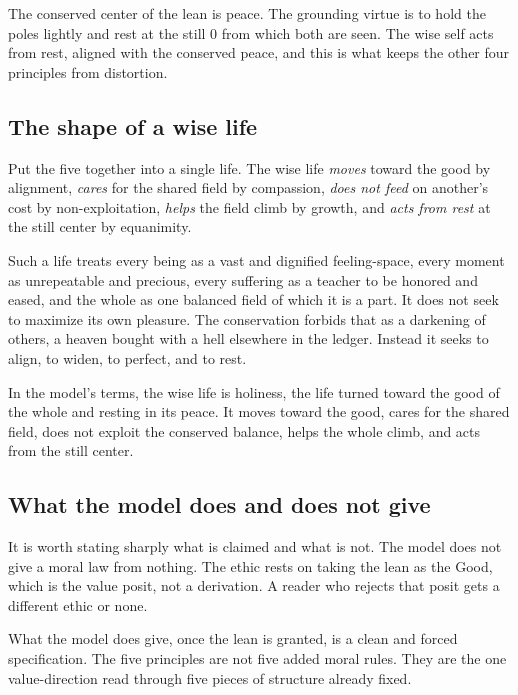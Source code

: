 \begin{principle}[Equanimity]
The conserved center of the lean is peace. The grounding virtue is to hold the poles lightly and rest at the still $0$ from which both are seen. The wise self acts from rest, aligned with the conserved peace, and this is what keeps the other four principles from distortion.
\end{principle}

\subsection{The shape of a wise life}

Put the five together into a single life. The wise life \emph{moves} toward the good by alignment, \emph{cares} for the shared field by compassion, \emph{does not feed} on another's cost by non-exploitation, \emph{helps} the field climb by growth, and \emph{acts from rest} at the still center by equanimity.

Such a life treats every being as a vast and dignified feeling-space, every moment as unrepeatable and precious, every suffering as a teacher to be honored and eased, and the whole as one balanced field of which it is a part. It does not seek to maximize its own pleasure. The conservation forbids that as a darkening of others, a heaven bought with a hell elsewhere in the ledger. Instead it seeks to align, to widen, to perfect, and to rest.

\begin{result}[Holiness]
In the model's terms, the wise life is holiness, the life turned toward the good of the whole and resting in its peace. It moves toward the good, cares for the shared field, does not exploit the conserved balance, helps the whole climb, and acts from the still center.
\end{result}

\subsection{What the model does and does not give}

It is worth stating sharply what is claimed and what is not. The model does not give a moral law from nothing. The ethic rests on taking the lean as the Good, which is the value posit, not a derivation. A reader who rejects that posit gets a different ethic or none.

What the model does give, once the lean is granted, is a clean and forced specification. The five principles are not five added moral rules. They are the one value-direction read through five pieces of structure already fixed.

